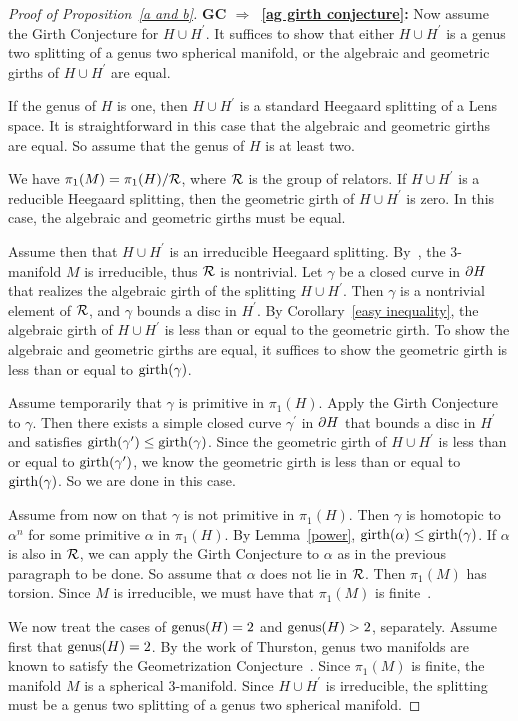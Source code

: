 \begin{proof}[Proof of Proposition~\ref{a and b}]
\textbf{GC $\Rightarrow$~\ref{ag girth conjecture}:}
Now assume the Girth Conjecture for $H\cup H^\prime$.  It suffices to show that either $H\cup H^\prime$ is a genus two splitting of a genus two spherical manifold, or the algebraic and geometric girths of $H\cup H^\prime$ are equal.

If the genus of $H$ is one, then $H\cup H^\prime$ is a standard Heegaard splitting of a Lens space.  It is straightforward in this case that the algebraic and geometric girths are equal.  So assume that the genus of $H$ is at least two.

We have $\pi_1(M)=\pi_1(H)/\mathcal{R}$, where $\mathcal{R}$ is the group of relators.  If $H\cup H^\prime$ is a reducible Heegaard splitting, then the geometric girth of 
$H\cup H^\prime$ is zero.  In this case, the algebraic and geometric 
girths must be equal.

Assume then that $H\cup H^\prime$ is an irreducible Heegaard splitting. By~\cite{Ha}, the 3-manifold $M$ is irreducible, thus $\mathcal{R}$ is nontrivial.  Let $\gamma$ be a closed curve in $\partial H$ that realizes the algebraic girth of the splitting $H\cup H^\prime$.  Then $\gamma$ is a nontrivial element of $\mathcal{R}$, and $\gamma$ bounds a disc in $H^\prime$.  By Corollary~\ref{easy inequality}, the algebraic girth of $H\cup H^{\prime}$ is less than or equal to the geometric girth.    To show the algebraic and geometric girths are equal, it suffices to show the geometric girth is less than or equal to $\operatorname{girth}(\gamma)$.

Assume temporarily that $\gamma$ is primitive in $\pi_1(H)$.  Apply the Girth
Conjecture to $\gamma$.  Then there exists a simple closed curve $\gamma^\prime$ in $\partial H$ that bounds a disc in $H^\prime$ and satisfies $\operatorname{girth}(\gamma^{\prime})\leq \operatorname{girth}(\gamma)$.  Since the geometric girth of $H\cup H^\prime$ is less than or equal to $\operatorname{girth}(\gamma^\prime)$, we know the geometric girth is less than or equal to $\operatorname{girth}(\gamma)$.  So we are done in this case.

Assume from now on that $\gamma$ is not primitive in $\pi_1(H)$.  Then 
$\gamma$ is homotopic to $\alpha^n$ for some primitive $\alpha$ in $\pi_1(H)$.  By Lemma~\ref{power},
$\operatorname{girth}(\alpha)\leq\operatorname{girth}(\gamma)$.  If $\alpha$ is also in $\mathcal{R}$, we 
can apply the Girth Conjecture to $\alpha$ as in the previous 
paragraph to be done.  So assume that $\alpha$ does not lie in $\mathcal{R}$.
Then $\pi_1(M)$ has torsion.  Since $M$ is irreducible, we must 
have that $\pi_1(M)$ is finite~\cite[Chapter 9]{He1}.

We now treat the cases of $\operatorname{genus}(H)=2$ and $\operatorname{genus}(H)>2$, separately.
Assume first that $\operatorname{genus}(H)=2$.  By the work of Thurston, genus two manifolds are known to satisfy the Geometrization Conjecture~\cite{Thu1}. Since $\pi_{1}(M)$ is finite, the manifold $M$ is a spherical 3-manifold. Since $H\cup H^\prime$ is irreducible, the splitting must be a genus two splitting of a genus two spherical manifold.


\end{proof}
